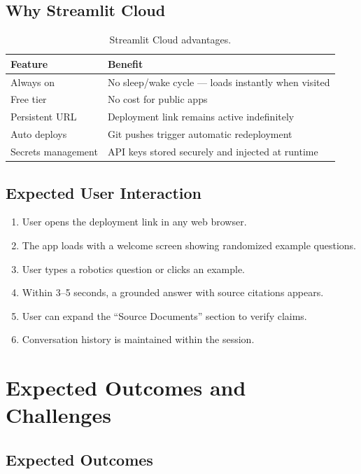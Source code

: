 \documentclass[12pt, a4paper]{article}
\begin{document}
\subsection{Why Streamlit Cloud}

\begin{table}[h]
\centering
\begin{tabular}{@{}ll@{}}
\toprule
\textbf{Feature} & \textbf{Benefit} \\
\midrule
Always on & No sleep/wake cycle --- loads instantly when visited \\
Free tier & No cost for public apps \\
Persistent URL & Deployment link remains active indefinitely \\
Auto deploys & Git pushes trigger automatic redeployment \\
Secrets management & API keys stored securely and injected at runtime \\
\bottomrule
\end{tabular}
\caption{Streamlit Cloud advantages.}
\end{table}

\subsection{Expected User Interaction}

\begin{enumerate}[nosep]
    \item User opens the deployment link in any web browser.
    \item The app loads with a welcome screen showing randomized example questions.
    \item User types a robotics question or clicks an example.
    \item Within 3--5 seconds, a grounded answer with source citations appears.
    \item User can expand the ``Source Documents'' section to verify claims.
    \item Conversation history is maintained within the session.
\end{enumerate}


\section{Expected Outcomes and Challenges}

\subsection{Expected Outcomes}
\end{document}
